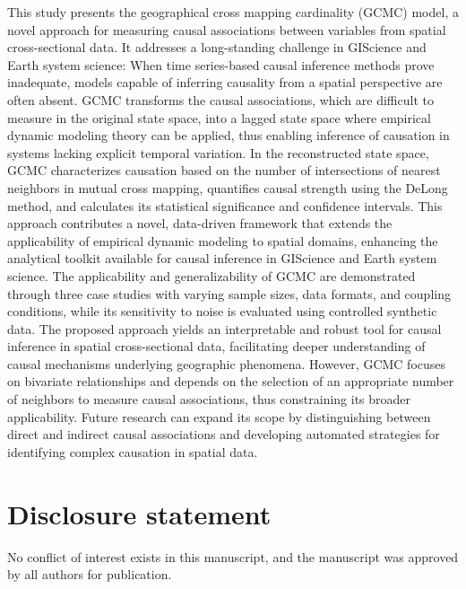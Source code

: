 \documentclass[authoryear,preprint,review,12pt]{elsarticle}
\begin{document}
This study presents the geographical cross mapping cardinality (GCMC) model, a novel approach for measuring causal associations between variables from spatial cross-sectional data. It addresses a long-standing challenge in GIScience and Earth system science: When time series-based causal inference methods prove inadequate, models capable of inferring causality from a spatial perspective are often absent. GCMC transforms the causal associations, which are difficult to measure in the original state space, into a lagged state space where empirical dynamic modeling theory can be applied, thus enabling inference of causation in systems lacking explicit temporal variation. In the reconstructed state space, GCMC characterizes causation based on the number of intersections of nearest neighbors in mutual cross mapping, quantifies causal strength using the DeLong method, and calculates its statistical significance and confidence intervals. This approach contributes a novel, data-driven framework that extends the applicability of empirical dynamic modeling to spatial domains, enhancing the analytical toolkit available for causal inference in GIScience and Earth system science. The applicability and generalizability of GCMC are demonstrated through three case studies with varying sample sizes, data formats, and coupling conditions, while its sensitivity to noise is evaluated using controlled synthetic data. The proposed approach yields an interpretable and robust tool for causal inference in spatial cross-sectional data, facilitating deeper understanding of causal mechanisms underlying geographic phenomena. However, GCMC focuses on bivariate relationships and depends on the selection of an appropriate number of neighbors to measure causal associations, thus constraining its broader applicability. Future research can expand its scope by distinguishing between direct and indirect causal associations and developing automated strategies for identifying complex causation in spatial data.

\section*{Disclosure statement}

No conflict of interest exists in this manuscript, and the manuscript was approved by all authors for publication.

\end{document}
